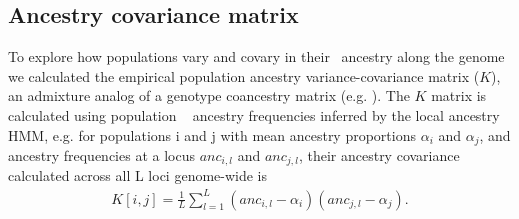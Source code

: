\subsection*{Ancestry covariance matrix}
To explore how populations vary and covary in their \scutellata\ ancestry along the genome we calculated the empirical population ancestry variance-covariance matrix ($K$), an admixture analog of a genotype coancestry matrix (e.g. \cite{Thornton:2012kz}). The $K$ matrix is calculated using population \scutellata\  ancestry frequencies inferred by the local ancestry HMM, e.g. for populations i and j with mean ancestry proportions $\alpha_i$ and $\alpha_j$, and ancestry frequencies at a locus $anc_{i,l}$ and $anc_{j, l}$, their ancestry covariance calculated across all L loci genome-wide is
\begin{align*}
K[i, j] = \frac{1}{L} \sum_{l=1}^{L} (anc_{i,l} - \alpha_i)(anc_{j,l} - \alpha_j).
\end{align*}

